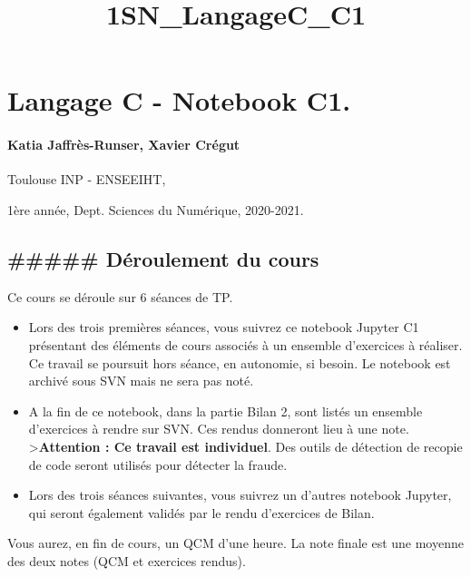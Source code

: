 \documentclass[11pt]{article}
\title{1SN\_LangageC\_C1}
\begin{document}
    
    \maketitle
    
    

    
    \hypertarget{langage-c---notebook-c1.}{%
\section{Langage C - Notebook C1.}\label{langage-c---notebook-c1.}}

\hypertarget{katia-jaffruxe8s-runser-xavier-cruxe9gut}{%
\paragraph{Katia Jaffrès-Runser, Xavier
Crégut}\label{katia-jaffruxe8s-runser-xavier-cruxe9gut}}

Toulouse INP - ENSEEIHT,

1ère année, Dept. Sciences du Numérique, 2020-2021.

    \hypertarget{duxe9roulement-du-cours}{%
\subsection{\#\#\#\#\# Déroulement du
cours}\label{duxe9roulement-du-cours}}

Ce cours se déroule sur 6 séances de TP.

\begin{itemize}
\item
  Lors des trois premières séances, vous suivrez ce notebook Jupyter C1
  présentant des éléments de cours associés à un ensemble d'exercices à
  réaliser. Ce travail se poursuit hors séance, en autonomie, si besoin.
  Le notebook est archivé sous SVN mais ne sera pas noté.
\item
  A la fin de ce notebook, dans la partie Bilan 2, sont listés un
  ensemble d'exercices à rendre sur SVN. Ces rendus donneront lieu à une
  note.\\
  \textgreater{}\textbf{Attention : Ce travail est individuel}. Des
  outils de détection de recopie de code seront utilisés pour détecter
  la fraude.
\item
  Lors des trois séances suivantes, vous suivrez un d'autres notebook
  Jupyter, qui seront également validés par le rendu d'exercices de
  Bilan.
\end{itemize}

Vous aurez, en fin de cours, un QCM d'une heure. La note finale est une
moyenne des deux notes (QCM et exercices rendus).
\end{document}
